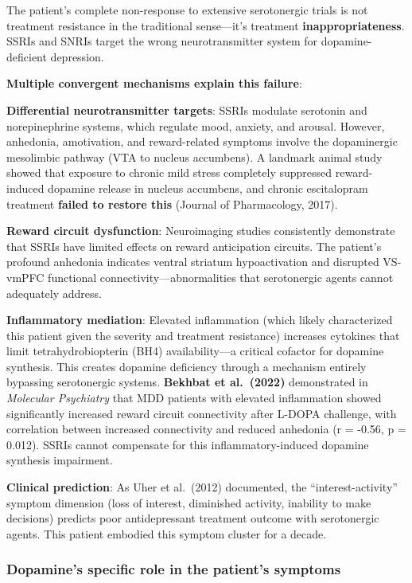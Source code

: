 The patient's complete non-response to extensive serotonergic trials is not treatment resistance in the traditional sense---it's treatment \textbf{inappropriateness}. SSRIs and SNRIs target the wrong neurotransmitter system for dopamine-deficient depression.

\textbf{Multiple convergent mechanisms explain this failure}:

\textbf{Differential neurotransmitter targets}: SSRIs modulate serotonin and norepinephrine systems, which regulate mood, anxiety, and arousal. However, anhedonia, amotivation, and reward-related symptoms involve the dopaminergic mesolimbic pathway (VTA to nucleus accumbens). A landmark animal study showed that exposure to chronic mild stress completely suppressed reward-induced dopamine release in nucleus accumbens, and chronic escitalopram treatment \textbf{failed to restore this} (Journal of Pharmacology, 2017).

\textbf{Reward circuit dysfunction}: Neuroimaging studies consistently demonstrate that SSRIs have limited effects on reward anticipation circuits. The patient's profound anhedonia indicates ventral striatum hypoactivation and disrupted VS-vmPFC functional connectivity---abnormalities that serotonergic agents cannot adequately address.

\textbf{Inflammatory mediation}: Elevated inflammation (which likely characterized this patient given the severity and treatment resistance) increases cytokines that limit tetrahydrobiopterin (BH4) availability---a critical cofactor for dopamine synthesis. This creates dopamine deficiency through a mechanism entirely bypassing serotonergic systems. \textbf{Bekhbat et al.~(2022)} demonstrated in \emph{Molecular Psychiatry} that MDD patients with elevated inflammation showed significantly increased reward circuit connectivity after L-DOPA challenge, with correlation between increased connectivity and reduced anhedonia (r = -0.56, p = 0.012). SSRIs cannot compensate for this inflammatory-induced dopamine synthesis impairment.

\textbf{Clinical prediction}: As Uher et al.~(2012) documented, the ``interest-activity'' symptom dimension (loss of interest, diminished activity, inability to make decisions) predicts poor antidepressant treatment outcome with serotonergic agents. This patient embodied this symptom cluster for a decade.

\subsubsection{Dopamine's specific role in the patient's symptoms}\label{10a_trd_basis-dopamines-specific-role-in-the-patients-symptoms}

